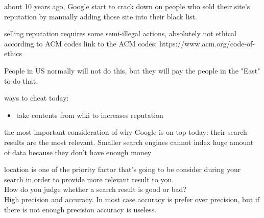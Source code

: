 \documentclass[fancy,11pt,titlestyle=display]{style/elegantbook}
\begin{document}
about 10 years ago, Google start to crack down on people who sold their site's reputation by manually adding those site into their black list.

selling reputation requires some semi-illegal actions, absolutely not ethical according to ACM codes
link to the ACM codes: https://www.acm.org/code-of-ethics

People in US normally will not do this, but they will pay the people in the "East" to do that.


ways to cheat today:
\begin{itemize}

    \item take contents from wiki to increases reputation
\end{itemize}{} 


the most important consideration of why Google is on top today: their search results are the most relevant.
Smaller search engines cannot index huge amount of data because they don't have enough money

location is one of the priority factor that's going to be consider during your search in order to provide more relevant result to you. \\
How do you judge whether a search result is good or bad?\\
High precision and accuracy. In most case accuracy is prefer over precision, but if there is not enough precision accuracy is useless.\\

\vfill
\graphicspath{{image/myfolder/}}
\end{document}
